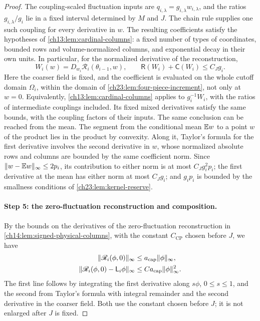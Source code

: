 \begin{proof}
The coupling-scaled fluctuation inputs are $q_{i,\lambda}=g_{i,\lambda}w_{i,\lambda}$, and the ratios $g_{i,\lambda}/g_i$ lie in a fixed interval determined by $M$ and $J$. The chain rule supplies one such coupling for every derivative in $w$. The resulting coefficients satisfy the hypotheses of \cref{ch13:lem:cardinal-columns}: a fixed number of types of coordinates, bounded rows and volume-normalized columns, and exponential decay in their own units. In particular, for the normalized derivative of the reconstruction,
\begin{equation}\label{ch24:eq:white-jacobian}
 W_i(w)=D_{w_i}\mathscr R_i(\theta_{i-1},w),\qquad \mathsf R(W_i)+\mathsf C(W_i)\le C_Jg_i.
\end{equation}
Here the coarser field is fixed, and the coefficient is evaluated on the whole cutoff domain $\Omega_i$, within the domain of \cref{ch23:lem:four-piece-increment}, not only at $w=0$. Equivalently, \cref{ch13:lem:cardinal-columns} applies to $g_i^{-1}W_i$, with the ratios of intermediate couplings included. Its fixed mixed derivatives satisfy the same bounds, with the coupling factors of their inputs. The same conclusion can be reached from the mean. The segment from the conditional mean $\mathbb E w$ to a point $w$ of the product lies in the product by convexity. Along it, Taylor's formula for the first derivative involves the second derivative in $w$, whose normalized absolute rows and columns are bounded by the same coefficient norm. Since $\lVert w-\mathbb E w\rVert_\infty\le2p_i$, its contribution to either norm is at most $C_Jg_i^2p_i$; the first derivative at the mean has either norm at most $C_Jg_i$; and $g_ip_i$ is bounded by the smallness conditions of \cref{ch23:lem:kernel-reserve}.

\paragraph{Step 5: the zero-fluctuation reconstruction and composition.}
By the bounds on the derivatives of the zero-fluctuation reconstruction in \cref{ch14:lem:signed-physical-columns}, with the constant $C_{\mathrm{CP}}$ chosen before $J$, we have
\begin{equation}\label{ch24:eq:center-jet-bounds}
 \begin{split}
 \lVert \mathscr R_i(\phi,0)\rVert_\infty&\le a_{\mathrm{cap}}\lVert \phi\rVert_\infty,\\
 \lVert \mathscr R_i(\phi,0)-\mathsf L_i\phi\rVert_\infty&\le Ca_{\mathrm{cap}}\lVert \phi\rVert_\infty^2.
 \end{split}
\end{equation}
The first line follows by integrating the first derivative along $s\phi$, $0\le s\le1$, and the second from Taylor's formula with integral remainder and the second derivative in the coarser field. Both use the constant chosen before $J$; it is not enlarged after $J$ is fixed.


\end{proof}
